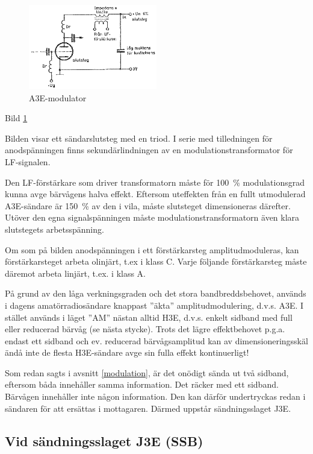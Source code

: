 \begin{figure}
\includegraphics[width=0.5\textwidth]{images/bild_2_3-89.png}
\caption{A3E-modulator}
\label{fig:BildII3-89}
\end{figure}

Bild \ref{fig:BildII3-89}

Bilden visar ett sändarslutsteg med en triod.  I serie med
tilledningen för anodspänningen finns sekundärlindningen av en
modulationstransformator för LF-signalen.

Den LF-förstärkare som driver transformatorn måste för 100~\%
modulationsgrad kunna avge bärvågens halva effekt. Eftersom uteffekten
från en fullt utmodulerad A3E-sändare är 150~\% av den i vila, måste
slutsteget dimensioneras därefter. Utöver den egna signalspänningen
måste modulationstransformatorn även klara slutstegets arbetsspänning.

Om som på bilden anodspänningen i ett förstärkarsteg amplitudmoduleras,
kan förstärkarsteget arbeta olinjärt, t.ex i klass C.
Varje följande förstärkarsteg måste däremot arbeta linjärt, t.ex. i klass A.

På grund av den låga verkningsgraden och det stora bandbreddsbehovet,
används i dagens amatörradiosändare knappast ''äkta''
amplitudmodulering, d.v.s. A3E. I stället används i läget ''AM'' nästan
alltid H3E, d.v.s. enkelt sidband med full eller reducerad bärvåg (se
nästa stycke). Trots det lägre effektbehovet p.g.a. endast ett sidband
och ev. reducerad bärvågsamplitud kan av dimensioneringsskäl ändå inte
de flesta H3E-sändare avge sin fulla effekt kontinuerligt!

Som redan sagts i avsnitt \ref{modulation}, är det onödigt sända ut två sidband,
eftersom båda innehåller samma information. Det räcker med ett
sidband. Bärvågen innehåller inte någon information. Den kan därför
undertryckas redan i sändaren för att ersättas i mottagaren. Därmed
uppstår sändningsslaget J3E.

\subsection{Vid sändningsslaget J3E (SSB)}

